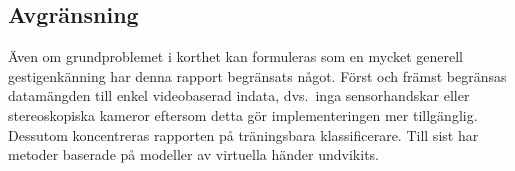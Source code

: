\documentclass[../rapport_MVEX01-11-05]{subfiles}
\begin{document}
\subsection{Avgränsning}

Även om grundproblemet i korthet kan formuleras som en mycket generell
gestigenkänning har denna rapport begränsats något. Först och främst
begränsas datamängden till enkel videobaserad indata, dvs.~inga sensorhandskar
eller stereoskopiska kameror eftersom detta gör implementeringen mer
tillgänglig. Dessutom koncentreras rapporten på träningsbara
klassificerare. Till sist har metoder baserade på modeller av virtuella händer
undvikits.


\end{document}
